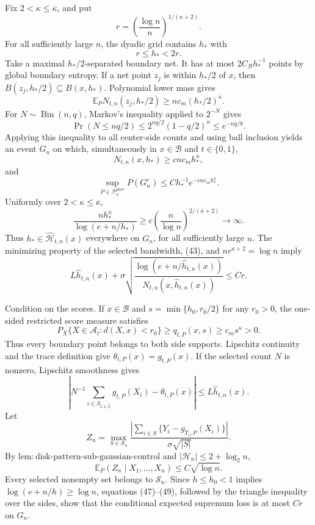 Fix \(2<\kappa\le\overline\kappa\), and put
\[
 r=\left(\frac{\log n}{n}\right)^{1/(\kappa+2)}.
\]
For all sufficiently large \(n\), the dyadic grid contains \(h_*\) with
\[
 r\le h_*<2r. \tag{43}
\]
Take a maximal \(h_*/2\)-separated boundary net.  It has at most
\(2C_{\mathcal B}h_*^{-1}\) points by global boundary entropy.  If a net
point \(z_j\) is within \(h_*/2\) of \(x\), then
\(B(z_j,h_*/2)\subseteq B(x,h_*)\).  Polynomial lower mass gives
\[
 \mathbb E_PN_{t,n}(z_j,h_*/2)
 \ge nc_m(h_*/2)^{\kappa}. \tag{44}
\]
For \(N\sim\operatorname{Bin}(n,q)\), Markov's inequality applied to
\(2^{-N}\) gives
\[
 \Pr(N\le nq/2)\le2^{nq/2}(1-q/2)^n\le e^{-nq/8}.
\]
Applying this inequality to all center-side counts and using ball
inclusion yields an event \(G_n\) on which, simultaneously in
\(x\in\mathcal B\) and \(t\in\{0,1\}\),
\[
 N_{t,n}(x,h_*)\ge c nc_mh_*^{\kappa},
\]
and
\[
 \sup_{P\in\mathcal P_{\kappa}^{\mathrm{perv}}}P(G_n^c)
 \le Ch_*^{-1}e^{-cnc_mh_*^{\kappa}}. \tag{45}
\]
Uniformly over \(2<\kappa\le\overline\kappa\),
\[
 \frac{nh_*^{\kappa}}{\log(e+n/h_*)}
 \ge c\left(\frac n{\log n}\right)^{2/(\overline\kappa+2)}
 \longrightarrow\infty. \tag{46}
\]
Thus \(h_*\in\widehat{\mathcal H}_{t,n}(x)\) everywhere on \(G_n\), for
all sufficiently large \(n\).  The minimizing property of the selected
bandwidth, (43), and \(nr^{\kappa+2}=\log n\) imply
\[
 L\widehat h_{t,n}(x)+
 \sigma\sqrt{\frac{\log(e+n/\widehat h_{t,n}(x))}
 {N_{t,n}(x,\widehat h_{t,n}(x))}}
 \le Cr. \tag{47}
\]

Condition on the scores.  If \(x\in\mathcal B\) and
\(s=\min\{h_0,r_0/2\}\) for any \(r_0>0\), the one-sided restricted
score measure satisfies
\[
 P_X\{X\in\mathcal A_t:d(X,x)<r_0\}
 \ge q_{t,P}(x,s)\ge c_ms^\kappa>0.
\]
Thus every boundary point belongs to both side supports.  Lipschitz
continuity and the trace definition give
\(\theta_{t,P}(x)=g_{t,P}(x)\).  If the selected count \(N\) is nonzero,
Lipschitz smoothness gives
\[
 \left|N^{-1}\sum_{i\in S_{t,x,\widehat h}}g_{t,P}(X_i)
 -\theta_{t,P}(x)\right|
 \le L\widehat h_{t,n}(x). \tag{48}
\]
Let
\[
 Z_n=\max_{S\in\mathscr S_n}
 \frac{|\sum_{i\in S}\{Y_i-g_{T_i,P}(X_i)\}|}
 {\sigma\sqrt{|S|}}.
\]
By
\(\mathrm{lem:disk\text{-}pattern\text{-}sub\text{-}gaussian\text{-}control}\)
and \(|\mathcal H_n|\le2+\log_2n\),
\[
 \mathbb E_P(Z_n\mid X_1,\ldots,X_n)\le C\sqrt{\log n}. \tag{49}
\]
Every selected nonempty set belongs to \(\mathscr S_n\).  Since
\(h\le h_0<1\) implies \(\log(e+n/h)\ge\log n\), equations (47)--(49),
followed by the triangle inequality over the sides, show that the
conditional expected supremum loss is at most \(Cr\) on \(G_n\).

